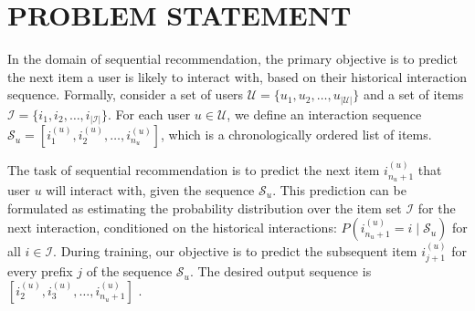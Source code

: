 \section{PROBLEM STATEMENT}

In the domain of sequential recommendation, the primary objective is to predict the next item a user is likely to interact with, based on their historical interaction sequence. Formally, consider a set of users $\mathcal{U} = \{u_1, u_2, \ldots, u_{|\mathcal{U}|}\}$ and a set of items $\mathcal{I} = \{i_1, i_2, \ldots, i_{|\mathcal{I}|}\}$. For each user $u \in \mathcal{U}$, we define an interaction sequence $\mathcal{S}_u = [i_1^{(u)}, i_2^{(u)}, \ldots, i_{n_u}^{(u)}]$, which is a chronologically ordered list of items.

The task of sequential recommendation is to predict the next item $i_{n_u+1}^{(u)}$ that user $u$ will interact with, given the sequence $\mathcal{S}_u$. 
This prediction can be formulated as estimating the probability distribution over the item set $\mathcal{I}$ for the next interaction, conditioned on the historical interactions: $P(i_{n_u+1}^{(u)} = i \mid \mathcal{S}_u)$ for all $i \in \mathcal{I}$.
During training, our objective is to predict the subsequent item $i^{(u)}_{j + 1}$ for every prefix $j$ of the sequence $\mathcal{S}_u$. The desired output sequence is $[i_2^{(u)}, i_3^{(u)}, \ldots, i_{n_u +1}^{(u)}]$ \cite{kang2018self}.